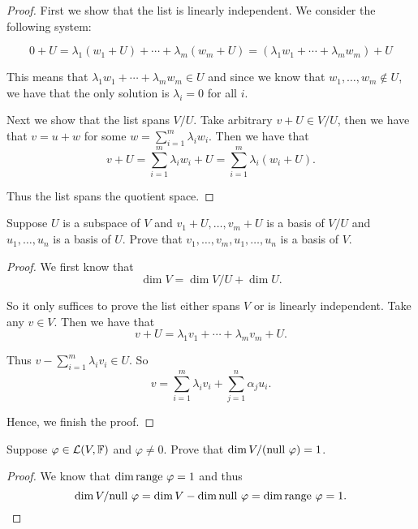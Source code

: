 \documentclass{extarticle}
\begin{document}
\begin{proof}
First we show that the list is linearly independent.  We consider the following system:

\[0 + U = \lambda_1(w_1 + U) + \cdots + \lambda_m (w_m + U) = (\lambda_1 w_1 
+ \cdots + \lambda_m w_m) + U\]

This means that \( \lambda_1 w_1 
+ \cdots + \lambda_m w_m \in U\) and since we know that \(w_1, \ldots, w_m \notin U\), we have 
that the only solution is \(\lambda_i = 0\) for all \(i\). 

Next we show that the list spans \(V / U\). Take arbitrary \(v + U \in V / U\), then we have that 
\(v = u + w\) for some \(w = \sum_{i=1}^{m} \lambda_i w_i\). Then we have that 
\[v + U = \sum_{i=1}^{m} \lambda_i w_i + U = \sum_{i=1}^{m} \lambda_i (w_i + U).\]

Thus the list spans the quotient space. 
\end{proof}

\begin{problem}{15}
    Suppose \(U\) is a subspace of \(V\) and \(v_1 + U, \ldots, v_m + U\) is a basis of 
    \(V /U\) and \(u_1, \ldots, u_n\) is a basis of \(U\). Prove that 
    \(v_1, \ldots, v_m, u_1, \ldots, u_n\) is a basis of \(V\). 
\end{problem}

\begin{proof}
We first know that 
\[\dim V = \dim V / U + \dim U.\]

So it only suffices to prove the list either spans \(V\) or is linearly independent. Take 
any \(v \in V\). Then we have that 
\[v + U = \lambda_1 v_1 + \cdots + \lambda_m v_m + U.\]

Thus \(v - \sum_{i=1}^{m}\lambda_i v_i \in U\). So 
\[v = \sum_{i=1}^{m} \lambda_i v_i + \sum_{j=1}^{n} \alpha_j u_i.\]

Hence, we finish the proof. 
\end{proof}

\begin{problem}{16}
    Suppose \(\varphi \in \mathcal{L}(V, \mathbb{F})\) and  \(\varphi \neq 0\). Prove that 
    \(\dim V / (\text{null } \varphi) = 1\). 
\end{problem}

\begin{proof}

We know that \(\dim \text{range } \varphi  = 1 \) and thus 
\[\dim V / \text{null } \varphi = \dim V  - \dim \text{null } \varphi = \dim \text{range } \varphi = 1.\]
\end{proof}
\end{document}
